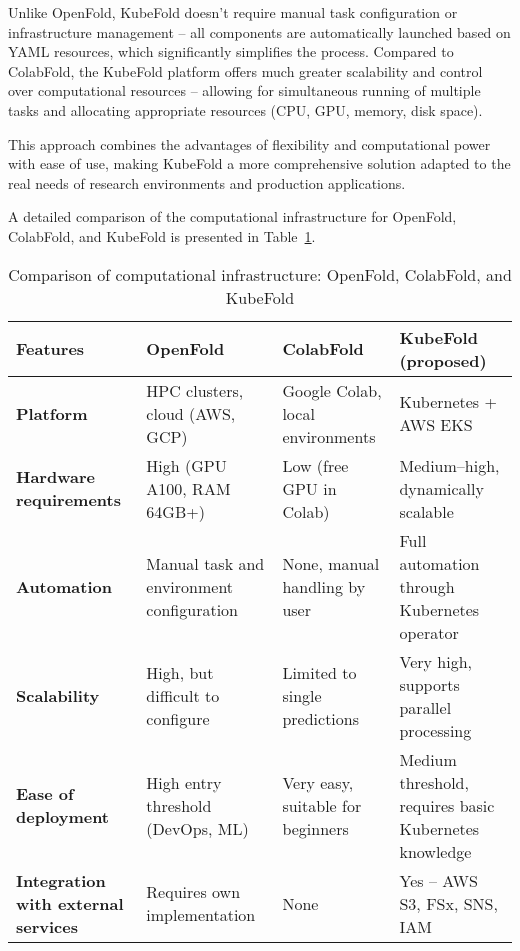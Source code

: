 Unlike OpenFold, KubeFold doesn't require manual task configuration or infrastructure management – all components are automatically launched based on YAML resources, which significantly simplifies the process.
Compared to ColabFold, the KubeFold platform offers much greater scalability and control over computational resources – allowing for simultaneous running of multiple tasks and allocating appropriate resources (CPU, GPU, memory, disk space).

This approach combines the advantages of flexibility and computational power with ease of use, making KubeFold a more comprehensive solution adapted to the real needs of research environments and production applications.

A detailed comparison of the computational infrastructure for OpenFold, ColabFold, and KubeFold is presented in Table~\ref{tab:comparison}.

\begin{table}[H]
    \centering
    \small
    \begin{tabularx}{\textwidth}{|X|X|X|X|}
        \hline
        \textbf{Features}                           & \textbf{OpenFold}                         & \textbf{ColabFold}                & \textbf{KubeFold (proposed)}                          \\
        \hline
        \textbf{Platform}                           & HPC clusters, cloud (AWS, GCP)            & Google Colab, local environments & Kubernetes + AWS EKS \\
        \hline
        \textbf{Hardware requirements}              & High (GPU A100, RAM 64GB+)                & Low (free GPU in Colab) & Medium--high, dynamically scalable \\
        \hline
        \textbf{Automation}                         & Manual task and environment configuration & None, manual handling by user & Full automation through Kubernetes operator \\
        \hline
        \textbf{Scalability}                        & High, but difficult to configure          & Limited to single predictions & Very high, supports parallel processing \\
        \hline
        \textbf{Ease of deployment}                 & High entry threshold (DevOps, ML)         & Very easy, suitable for beginners & Medium threshold, requires basic Kubernetes knowledge \\
        \hline
        \textbf{Integration with external services} & Requires own implementation               & None                              & Yes – AWS S3, FSx, SNS, IAM                           \\
        \hline
    \end{tabularx}
    \caption{Comparison of computational infrastructure: OpenFold, ColabFold, and KubeFold}
    \label{tab:comparison}
\end{table}

